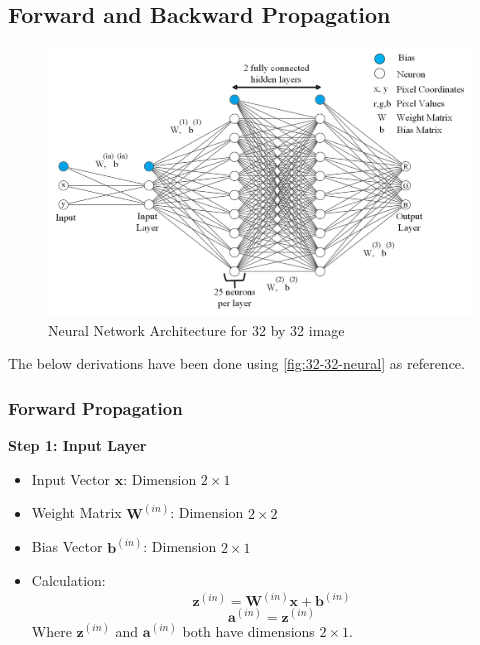 \documentclass{ioereport}
\begin{document}
\pagebreak


\setcounter{subsection}{1}
\subsection{Forward and Backward Propagation}
\label{app:forward-backward-eqn}

\begin{figure}[H]
    \centering
    \includegraphics[width=\linewidth]{assets/32_32_neural.png}
    \caption{Neural Network Architecture for 32 by 32 image}
    \label{fig:32-32-neural}
\end{figure}

The below derivations have been done using \autoref{fig:32-32-neural} as reference.
\subsubsection{Forward Propagation}
\textbf{Step 1: Input Layer}
\begin{itemize}
  \item Input Vector $\mathbf{x}$: Dimension $2 \times 1$
  \item Weight Matrix $\mathbf{W}^{(in)}$: Dimension $2 \times 2$
  \item Bias Vector $\mathbf{b}^{(in)}$: Dimension $2 \times 1$
  \item Calculation:
  \begin{equation}
  \mathbf{z}^{(in)} = \mathbf{W}^{(in)} \mathbf{x} + \mathbf{b}^{(in)}
  \end{equation}
  \begin{equation}
  \mathbf{a}^{(in)} = \mathbf{z}^{(in)}
  \end{equation}
  Where $\mathbf{z}^{(in)}$ and $\mathbf{a}^{(in)}$ both have dimensions $2 \times 1$.
\end{itemize}
\end{document}
